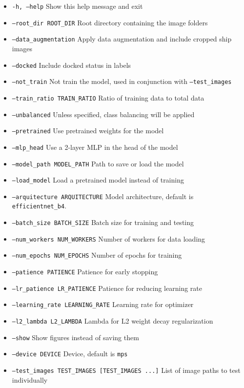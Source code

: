 \documentclass{article}
\begin{document}
\begin{itemize}
    \item \texttt{-h, --help} \hfill Show this help message and exit
    \item \texttt{--root\_dir ROOT\_DIR} \hfill Root directory containing the image folders
    \item \texttt{--data\_augmentation} \hfill Apply data augmentation and include cropped ship images
    \item \texttt{--docked} \hfill Include docked status in labels
    \item \texttt{--not\_train} \hfill Not train the model, used in conjunction with \texttt{--test\_images}
    \item \texttt{--train\_ratio TRAIN\_RATIO} \hfill Ratio of training data to total data
    \item \texttt{--unbalanced} \hfill Unless specified, class balancing will be applied
    \item \texttt{--pretrained} \hfill Use pretrained weights for the model
    \item \texttt{--mlp\_head} \hfill Use a 2-layer MLP in the head of the model
    \item \texttt{--model\_path MODEL\_PATH} \hfill Path to save or load the model
    \item \texttt{--load\_model} \hfill Load a pretrained model instead of training
    \item \texttt{--arquitecture ARQUITECTURE} \hfill Model architecture, default is \texttt{efficientnet\_b4}.
    \item \texttt{--batch\_size BATCH\_SIZE} \hfill Batch size for training and testing
    \item \texttt{--num\_workers NUM\_WORKERS} \hfill Number of workers for data loading
    \item \texttt{--num\_epochs NUM\_EPOCHS} \hfill Number of epochs for training
    \item \texttt{--patience PATIENCE} \hfill Patience for early stopping
    \item \texttt{--lr\_patience LR\_PATIENCE} \hfill Patience for reducing learning rate
    \item \texttt{--learning\_rate LEARNING\_RATE} \hfill Learning rate for optimizer
    \item \texttt{--l2\_lambda L2\_LAMBDA} \hfill Lambda for L2 weight decay regularization
    \item \texttt{--show} \hfill Show figures instead of saving them
    \item \texttt{--device DEVICE} \hfill Device, default is \texttt{mps}
    \item \texttt{--test\_images TEST\_IMAGES [TEST\_IMAGES ...]} \hfill List of image paths to test individually
\end{itemize}








\newpage



\end{document}
